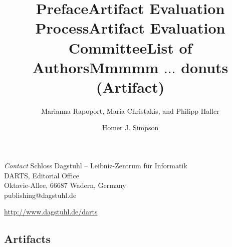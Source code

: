 \documentclass[a4paper,UKenglish]{dartsmaster}
\begin{document}
\begin{publicationinfo}
\bigskip
\emph{Contact}\newline
Schloss Dagstuhl -- Leibniz-Zentrum f\"ur Informatik\\
DARTS, Editorial Office\\
Oktavie-Allee, 66687 Wadern, Germany\\ 
publishing@dagstuhl.de


\bigskip

\url{http://www.dagstuhl.de/darts}
 
 \thispagestyle{empty}
 \onecolumn

\newpage

\end{publicationinfo}




\begin{contentslist}

\contitem
\title{Preface}
\author{Marianna Rapoport, Maria Christakis, and Philipp Haller}

\contitem
\title{Artifact Evaluation Process}
\author{ }

\contitem
\title{Artifact Evaluation Committee}
\author{ }

\contitem
\title{List of Authors}
\author{ }

\part{Artifacts}


\contitem
\title{Mmmmm $\ldots$ donuts (Artifact)}
\author{Homer J. Simpson}


\end{contentslist}
\end{document}
